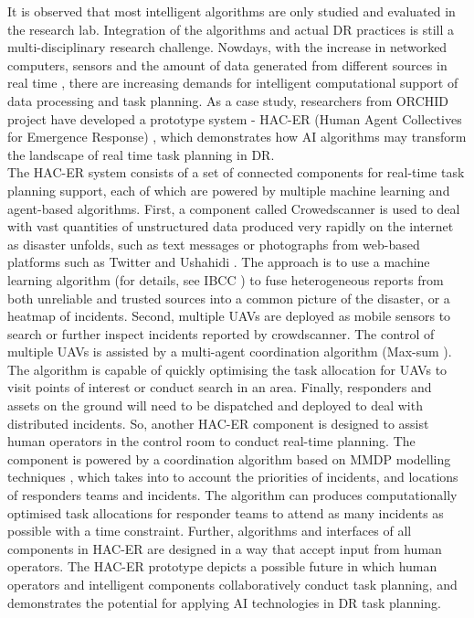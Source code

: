 It is observed that most intelligent algorithms are only studied and evaluated in the research lab. Integration of the algorithms and actual \ac{DR} practices is still a multi-disciplinary research challenge. Nowdays, with the increase in networked computers, sensors and the amount of data generated from different sources in real time \citep{Ramchurn2015}, there are increasing demands for intelligent computational support of data processing and task planning. As a case study, researchers from ORCHID project have developed a prototype system - HAC-ER (Human Agent Collectives for Emergence Response) \citep{Jennings2014,Ramchurn2015,Ramchurn2015a}, which demonstrates how \ac{AI} algorithms may transform the landscape of real time task planning in \ac{DR}.\\

The \ac{HAC-ER} system consists of a set of connected components for real-time task planning support, each of which are powered by multiple machine learning and agent-based algorithms. First, a component called Crowedscanner is used to deal with vast quantities of unstructured data produced very rapidly on the internet as disaster unfolds, such as text messages or photographs from web-based platforms such as Twitter and Ushahidi \citep{Morrow2011}. The approach is to use a machine learning algorithm (for details, see IBCC \citep{Simpson}) to fuse heterogeneous reports from both unreliable and trusted sources into a common picture of the disaster, or a heatmap of incidents. Second, multiple  \acf{UAV}s are deployed as mobile sensors to search or further inspect incidents reported by crowdscanner. The control of multiple \ac{UAV}s is assisted by a multi-agent coordination algorithm (Max-sum \citep{Ramchurn2010}). The algorithm is capable of quickly optimising the task allocation for \ac{UAV}s to visit points of interest or conduct search in an area.  Finally, responders and assets on the ground will need to be dispatched and deployed to deal with distributed incidents. So, another \ac{HAC-ER} component is designed to assist human operators in the control room to conduct real-time planning. The component is powered by a coordination algorithm based on MMDP modelling techniques \citep{Wu2015}, which takes into to account the priorities of incidents, and locations of responders teams and incidents. The algorithm can produces computationally optimised task allocations for responder teams to attend as many incidents as possible with a time constraint. Further, algorithms and interfaces of all components in \ac{HAC-ER} are designed in a way that accept input from human operators. The \ac{HAC-ER} prototype depicts a possible future in which human operators and intelligent components collaboratively conduct task planning, and demonstrates the potential for applying \ac{AI} technologies in \ac{DR} task planning.\\

